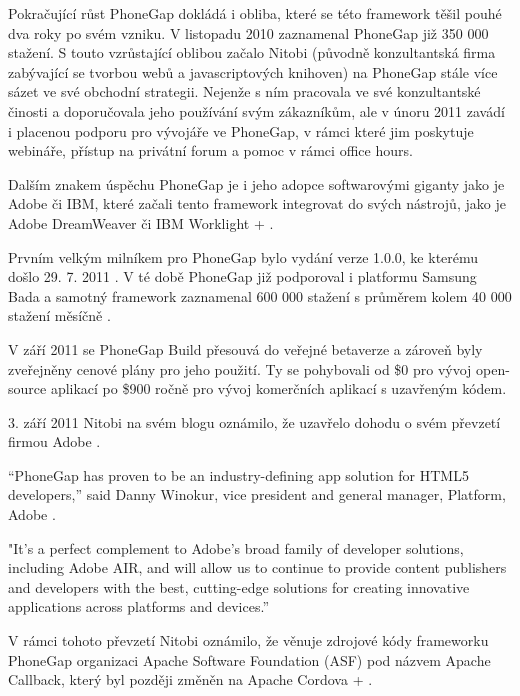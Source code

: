 Pokračující růst PhoneGap dokládá i obliba, které se této framework těšil pouhé dva roky po svém vzniku. V listopadu 2010 zaznamenal PhoneGap již 350 000 stažení. S touto vzrůstající oblibou začalo Nitobi (původně konzultantská firma zabývající se tvorbou webů a javascriptových knihoven) na PhoneGap stále více sázet ve své obchodní strategii. Nejenže s ním pracovala ve své konzultantské činosti a doporučovala jeho používání svým zákazníkům, ale v únoru 2011 zavádí i placenou podporu pro vývojáře ve PhoneGap, v rámci které jim poskytuje webináře, přístup na privátní forum a pomoc v rámci office hours.

Dalším znakem úspěchu PhoneGap je i jeho adopce softwarovými giganty jako je Adobe či IBM, které začali tento framework integrovat do svých nástrojů, jako je Adobe DreamWeaver či IBM Worklight \cite{phonegap_worklight_enterprise} + \cite{dreamweaver_supports_phonegap}. 

Prvním velkým milníkem pro PhoneGap bylo vydání verze 1.0.0, ke kterému došlo 29. 7. 2011 \cite{phonegap_1_released}. V té době PhoneGap již podporoval i platformu Samsung Bada a samotný framework zaznamenal 600 000 stažení s průměrem kolem 40 000 stažení měsíčně \cite{phonegap_1_released}. 

V září 2011 se PhoneGap Build přesouvá do veřejné betaverze a zároveň byly zveřejněny cenové plány pro jeho použití. Ty se pohybovali od \$0 pro vývoj open-source aplikací po \$900 ročně pro vývoj komerčních aplikací s uzavřeným kódem. \cite{phonegap_build_open_beta}

3. září 2011 Nitobi na svém blogu oznámilo, že uzavřelo dohodu o svém převzetí firmou Adobe \cite{nitobi_adobe1}.

“PhoneGap has proven to be an industry-defining app solution for HTML5 developers,” said Danny Winokur, vice president and general manager, Platform, Adobe \cite{nitobi_adobe1}.

"It’s a perfect complement to Adobe’s broad family of developer solutions, including Adobe AIR, and will allow us to continue to provide content publishers and developers with the best, cutting-edge solutions for creating innovative applications across platforms and devices.” \cite{nitobi_adobe1}

V rámci tohoto převzetí Nitobi oznámilo, že věnuje zdrojové kódy frameworku PhoneGap organizaci Apache Software Foundation (ASF) pod názvem Apache Callback, který byl později změněn na Apache Cordova \cite{nitobi_adobe2} + \cite{phonegap_13_released}. 

